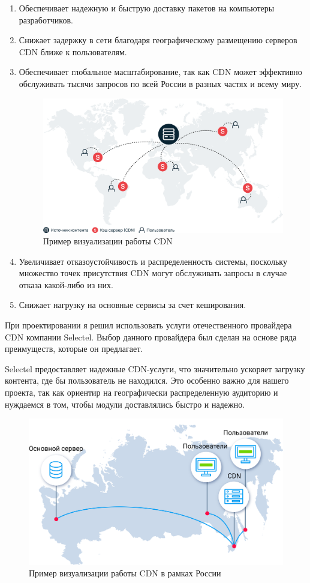 \begin{enumerate}
    \item Обеспечивает надежную и быструю доставку пакетов на компьютеры разработчиков.
    \item Снижает задержку в сети благодаря географическому размещению серверов CDN ближе к пользователям.
    \item Обеспечивает глобальное масштабирование, так как CDN может эффективно обслуживать тысячи запросов по всей России в разных частях и всему миру.
\begin{figure}
  \centering
  \includegraphics[width=.8\textwidth]{graphics/img/sheme-cdn}
  \caption{Пример визуализации работы CDN}
  \label{fig:mono}
\end{figure}

    \item Увеличивает отказоустойчивость и распределенность системы, поскольку множество точек присутствия CDN могут обслуживать запросы в случае отказа какой-либо из них.
    \item Снижает нагрузку на основные сервисы за счет кеширования.
\end{enumerate}

 При проектировании я решил использовать услуги отечественного провайдера CDN компании Selectel. \cite{cdn:selectel} Выбор данного провайдера был сделан на основе ряда преимуществ, которые он предлагает.

Selectel предоставляет надежные CDN-услуги, что значительно ускоряет загрузку контента, где бы пользователь не находился. Это особенно важно для нашего проекта, так как ориентир на географически распределенную аудиторию и нуждаемся в том, чтобы модули доставлялись быстро и надежно.

\begin{figure}
  \centering
  \includegraphics[width=.8\textwidth]{graphics/img/cdn.scheme.5Y4Ydf}
  \caption{Пример визуализации работы CDN в рамках России}
  \label{fig:mono}
\end{figure}

